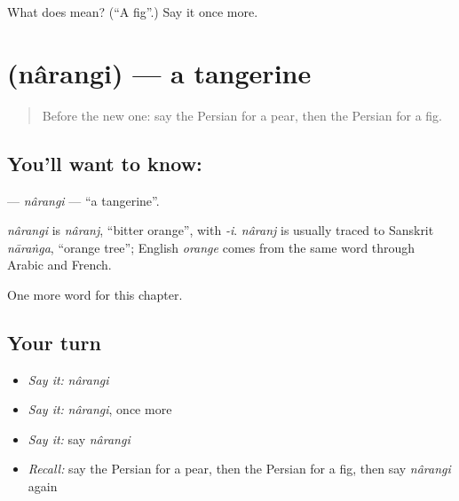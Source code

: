 \begin{tcolorbox}[breakable,colback=teal!4,colframe=teal!35!black,title={Before you move on}]
What does  mean? (\textquotedblleft{}A fig\textquotedblright{}.) Say it once more.
\end{tcolorbox}
\section[\texorpdfstring{\fa{نارنگی} (nârangi)}{نارنگی (nârangi)}]{ (nârangi) — a tangerine}

\label{lesson:FA-C241-narangi}



\begin{quote}
Before the new one: say the Persian for a pear, then the Persian for a fig.
\end{quote}

\subsection*{You'll want to know: }
\textbf{} — \emph{nârangi} — \textquotedblleft{}a tangerine\textquotedblright{}.

\begin{cousinweb}
\emph{nârangi} is \emph{nâranj}, \textquotedblleft{}bitter orange\textquotedblright{}, with \emph{-i}. \emph{nâranj} is usually traced to Sanskrit \emph{nāraṅga}, \textquotedblleft{}orange tree\textquotedblright{}; English \emph{orange} comes from the same word through Arabic and French.
\end{cousinweb}

\begin{grammarlens}[title={What you've built}]
One more word for this chapter.
\end{grammarlens}

\subsection*{Your turn}
\begin{itemize}
\raggedright
  \item \emph{Say it:} \emph{nârangi}
  \item \emph{Say it:} \emph{nârangi}, once more
  \item \emph{Say it:} say \emph{nârangi}
  \item \emph{Recall:} say the Persian for a pear, then the Persian for a fig, then say \emph{nârangi} again
\end{itemize}

